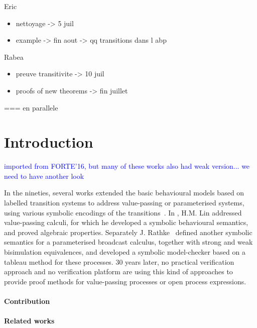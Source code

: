 \documentclass{lncs/llncs}
\newcommand{\ERIC}[1]{\textcolor{blue}{#1}}
\begin{document}
Eric
\begin{itemize}
\item nettoyage -> 5 juil
\item example -> fin aout -> qq transitions dans l abp
\end{itemize}
\medskip

Rabea
\begin{itemize}
\item preuve transitivite -> 10 juil
\item proofs of new theorems -> fin juillet
\end{itemize}
=== en parallele

\section{Introduction}

\ERIC{imported from FORTE'16, but many of these works also had weak
  version... we need to have another look}

In the nineties, several 
works extended the basic behavioural models based on labelled
transition systems to address value-passing or parameterised systems, using
various symbolic encodings of the
transitions~\cite{deSimone85,Larsen87,HennessyLin:TCS95,Linconcur96}. 
In \cite{Linconcur96}, H.M. Lin addressed value-passing calculi, for which he
developed a symbolic behavioural semantics, and proved algebraic properties.
Separately J. Rathke~\cite{HennessyRathke:TCS98} defined another
symbolic semantics for 
a parameterised broadcast calculus, together with strong and weak bisimulation
equivalences, and developed a symbolic model-checker based on a tableau
method for these processes. 30 years later, no
practical verification approach and no verification platform are
using this kind of approaches to provide proof methods for
value-passing processes or open process expressions. 

\paragraph{Contribution}

\paragraph{Related works}
\end{document}
